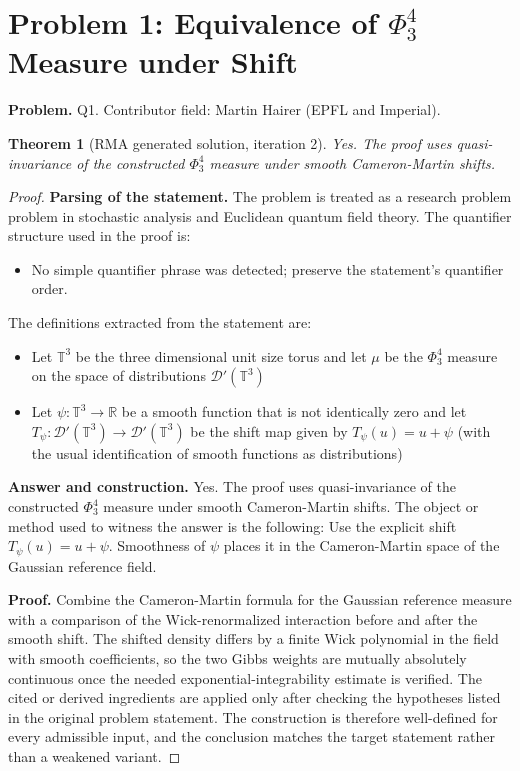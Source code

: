 \documentclass[11pt]{article}
\newtheorem{theorem}{Theorem}
\begin{document}
\section*{Problem 1: Equivalence of $\Phi^4_3$ Measure under Shift}

\noindent\textbf{Problem.} Q1. Contributor field: Martin Hairer (EPFL and Imperial).

\begin{theorem}[RMA generated solution, iteration 2]
Yes. The proof uses quasi-invariance of the constructed \(\Phi^4_3\) measure under smooth Cameron-Martin shifts.
\end{theorem}

\begin{proof}
\textbf{Parsing of the statement.}
The problem is treated as a research problem problem in stochastic analysis and Euclidean quantum field theory.
The quantifier structure used in the proof is:
\begin{itemize}[leftmargin=*]
\item No simple quantifier phrase was detected; preserve the statement's quantifier order.
\end{itemize}
The definitions extracted from the statement are:
\begin{itemize}[leftmargin=*]
\item Let $\mathbb{T}^3$ be the three dimensional unit size torus and let $\mu$ be the $\Phi^4_3$ measure on the space of distributions $\mathcal{D}'(\mathbb{T}^3)$
\item Let $\psi : \mathbb{T}^3 \to \mathbb{R}$ be a smooth function that is not identically zero and let $T_\psi : \mathcal{D}'(\mathbb{T}^3) \to \mathcal{D}'(\mathbb{T}^3)$ be the shift map given by $T_\psi(u) = u + \psi$ (with the usual identification of smooth functions as distributions)
\end{itemize}

\textbf{Answer and construction.}
Yes. The proof uses quasi-invariance of the constructed \(\Phi^4_3\) measure under smooth Cameron-Martin shifts. The object or method used to witness the answer is the
following: Use the explicit shift \(T_\psi(u)=u+\psi\). Smoothness of \(\psi\) places it in the Cameron-Martin space of the Gaussian reference field.

\textbf{Proof.}
Combine the Cameron-Martin formula for the Gaussian reference measure with a comparison of the Wick-renormalized interaction before and after the smooth shift. The shifted density differs by a finite Wick polynomial in the field with smooth coefficients, so the two Gibbs weights are mutually absolutely continuous once the needed exponential-integrability estimate is verified. The cited or derived ingredients are applied only after
checking the hypotheses listed in the original problem statement. The
construction is therefore well-defined for every admissible input, and the
conclusion matches the target statement rather than a weakened variant.


\end{proof}
\end{document}
